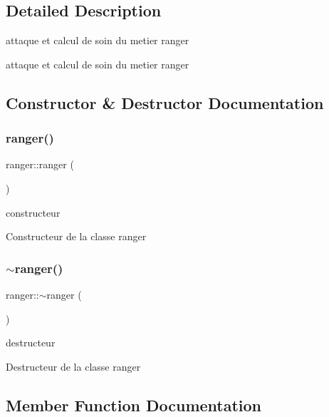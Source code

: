 \subsection{Detailed Description}
attaque et calcul de soin du metier ranger 

attaque et calcul de soin du metier ranger 

\subsection{Constructor \& Destructor Documentation}
\mbox{\label{classranger_a6f1936af8add92374cff7cf6c61264a2}} 
\subsubsection{\texorpdfstring{ranger()}{ranger()}}
{\footnotesize\ttfamily ranger\+::ranger (\begin{DoxyParamCaption}{ }\end{DoxyParamCaption})}



constructeur 

Constructeur de la classe ranger \mbox{\label{classranger_af74328483dc87135af349240b1c4fbc3}} 
\subsubsection{\texorpdfstring{$\sim$ranger()}{~ranger()}}
{\footnotesize\ttfamily ranger\+::$\sim$ranger (\begin{DoxyParamCaption}{ }\end{DoxyParamCaption})}



destructeur 

Destructeur de la classe ranger 

\subsection{Member Function Documentation}
\mbox{\label{classranger_ab460e3ff6701998d748fa9cbdb2fdf16}} 
